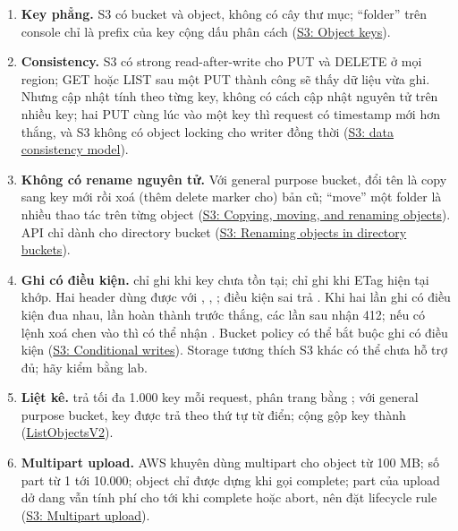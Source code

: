 \begin{enumerate}[resume]
  \item \textbf{Key phẳng.} S3 có bucket và object, không có cây thư mục; ``folder'' trên console chỉ là prefix của key cộng dấu phân cách \code{/} (\href{https://docs.aws.amazon.com/AmazonS3/latest/userguide/object-keys.html}{S3: Object keys}).
  \item \textbf{Consistency.} S3 có strong read-after-write cho PUT và DELETE ở mọi region; GET hoặc LIST sau một PUT thành công sẽ thấy dữ liệu vừa ghi. Nhưng cập nhật tính theo từng key, không có cách cập nhật nguyên tử trên nhiều key; hai PUT cùng lúc vào một key thì request có timestamp mới hơn thắng, và S3 không có object locking cho writer đồng thời (\href{https://docs.aws.amazon.com/AmazonS3/latest/userguide/Welcome.html\#ConsistencyModel}{S3: data consistency model}).
  \item \textbf{Không có rename nguyên tử.} Với general purpose bucket, đổi tên là copy sang key mới rồi xoá (thêm delete marker cho) bản cũ; ``move'' một folder là nhiều thao tác trên từng object (\href{https://docs.aws.amazon.com/AmazonS3/latest/userguide/copy-object.html}{S3: Copying, moving, and renaming objects}). API  chỉ dành cho directory bucket (\href{https://docs.aws.amazon.com/AmazonS3/latest/userguide/directory-buckets-objects-rename.html}{S3: Renaming objects in directory buckets}).
  \item \textbf{Ghi có điều kiện.}  chỉ ghi khi key chưa tồn tại;  chỉ ghi khi ETag hiện tại khớp. Hai header dùng được với , , ; điều kiện sai trả . Khi hai lần ghi có điều kiện đua nhau, lần hoàn thành trước thắng, các lần sau nhận 412; nếu có lệnh xoá chen vào thì có thể nhận . Bucket policy có thể bắt buộc ghi có điều kiện (\href{https://docs.aws.amazon.com/AmazonS3/latest/userguide/conditional-writes.html}{S3: Conditional writes}). Storage tương thích S3 khác có thể chưa hỗ trợ đủ; hãy kiểm bằng lab.
  \item \textbf{Liệt kê.}  trả tối đa 1.000 key mỗi request, phân trang bằng ; với general purpose bucket, key được trả theo thứ tự từ điển;  cộng  gộp key thành  (\href{https://docs.aws.amazon.com/AmazonS3/latest/API/API_ListObjectsV2.html}{ListObjectsV2}).
  \item \textbf{Multipart upload.} AWS khuyên dùng multipart cho object từ 100 MB; số part từ 1 tới 10.000; object chỉ được dựng khi gọi complete; part của upload dở dang vẫn tính phí cho tới khi complete hoặc abort, nên đặt lifecycle rule  (\href{https://docs.aws.amazon.com/AmazonS3/latest/userguide/mpuoverview.html}{S3: Multipart upload}).

\end{enumerate}
